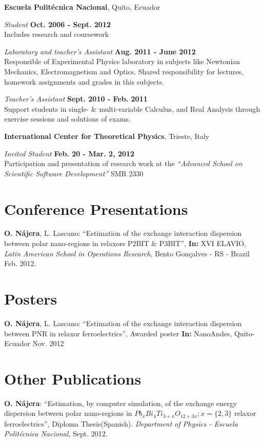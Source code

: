 \documentclass[margin,line]{res}
\newenvironment{list1}{
  \begin{list}{\ding{113}}{%
      \setlength{\itemsep}{0in}
      \setlength{\parsep}{0in} \setlength{\parskip}{0in}
      \setlength{\topsep}{0in} \setlength{\partopsep}{0in} 
      \setlength{\leftmargin}{0.17in}}}{\end{list}}
\begin{document}
\begin{resume}
  {\bf Escuela Politécnica Nacional}, Quito, Ecuador
  \begin{list1}
   \item[] {\em Student} \hfill {\bf Oct. 2006 - Sept. 2012}\\
    Includes research and coursework\\
   \item[] {\em Laboratory and teacher's Assistant} \hfill {\bf Aug. 2011 - June 2012}\\
    Responsible of Experimental Physics laboratory in subjects
    like Newtonian Mechanics, Electromagnetism and Optics.
    Shared responsibility for lectures, homework assignments and grades in this subjects.\\
   \item[] {\em Teacher's Assistant} \hfill {\bf Sept. 2010 - Feb. 2011}\\
    Support students in single- \& multi-variable Calculus, and Real Analysis through
    exercise sessions and solutions of exams.
  \end{list1}

  {\bf International Center for Theoretical Physics}, Trieste, Italy
  \begin{list1}
    \item[] {\em Invited Student} \hfill {\bf Feb. 20 - Mar. 2, 2012} \\
    Participation and presentation of research work at the {\em ``Advanced School on Scientific
    Software Development''} SMR 2330
  \end{list1}

\section{\sc Conference Presentations}
  {\bf O. Nájera}, L. Lascano: ``Estimation of the exchange interaction dispersion between polar
  nano-regions in relaxors P2BIT \& P3BIT'', {\bf In:} XVI ELAVIO, {\em Latin American School in Operations Research}, Bento Gonçalves - RS - Brazil Feb. 2012.

\section{\sc Posters}
  {\bf O. Nájera}, L. Lascano: ``Estimation of the exchange interaction dispersion between PNR in
  relaxor ferroelectrics'',  Awarded poster {\bf In:} NanoAndes, Quito-Ecuador Nov. 2012

\section{\sc Other Publications}
  {\bf O. Nájera}: ``Estimation, by computer simulation, of the exchange energy dispersion between
  polar nano-regions in $Pb_xBi_4Ti_{3+x}O_{12+3x}; x=\{2,3\}$ relaxor ferroelectrics'', Diploma
  Thesis(Spanish). {\em Department of Physics - Escuela Politécnica Nacional}, Sept. 2012.


\end{resume}
\end{document}
